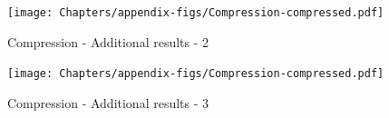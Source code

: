 \newpage
 \begin{figure}[ht]
   \centering
  {\texttt{[image: Chapters/appendix-figs/Compression-compressed.pdf]}}
  \caption{Compression - Additional results - 2}
    \label{fig:appendix-compression2}
 \end{figure}

\newpage
 \begin{figure}[ht]
   \centering
  {\texttt{[image: Chapters/appendix-figs/Compression-compressed.pdf]}}
  \caption{Compression - Additional results - 3}
    \label{fig:appendix-compression3}
 \end{figure}

